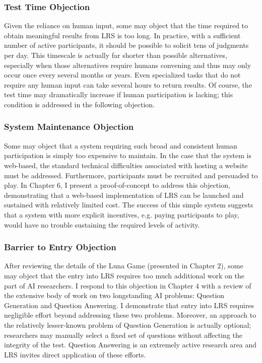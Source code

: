 \subsubsection{Test Time Objection}

Given the reliance on human input, some may object that the time required to obtain meaningful results from LRS is too long. In practice, with a sufficient number of active participants, it should be possible to solicit tens of judgments per day. This timescale is actually far shorter than possible alternatives, especially when those alternatives require humans convening and thus may only occur once every several months or years. Even specialized tasks that do not require any human input can take several hours to return results. Of course, the test time may dramatically increase if human participation is lacking; this condition is addressed in the following objection.

\subsubsection{System Maintenance Objection}

Some may object that a system requiring such broad and consistent human participation is simply too expensive to maintain. In the case that the system is web-based, the standard technical difficulties associated with hosting a website must be addressed. Furthermore, participants must be recruited and persuaded to play. In Chapter $6$, I present a proof-of-concept to address this objection, demonstrating that a web-based implementation of LRS can be launched and sustained with relatively limited cost. The success of this simple system suggests that a system with more explicit incentives, e.g. paying participants to play, would have no trouble sustaining the required levels of activity.

\subsubsection{Barrier to Entry Objection}

After reviewing the details of the Luna Game (presented in Chapter $2$), some may object that the entry into LRS requires too much additional work on the part of AI researchers. I respond to this objection in Chapter $4$ with a review of the extensive body of work on two longstanding AI problems: Question Generation and Question Answering. I demonstrate that entry into LRS requires negligible effort beyond addressing these two problems. Moreover, an approach to the relatively lesser-known problem of Question Generation is actually optional; researchers may manually select a fixed set of questions without affecting the integrity of the test. Question Answering is an extremely active research area and LRS invites direct application of these efforts.

